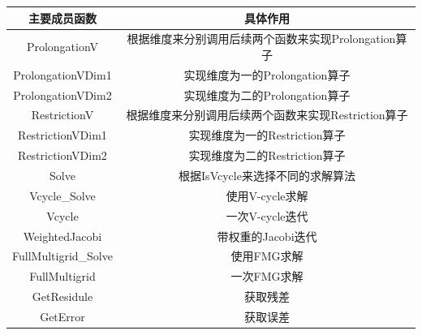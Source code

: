 \documentclass[twoside,a4paper]{article}
\begin{document}
\begin{center}
    \begin{tabular}{c|c}
        主要成员函数         & 具体作用                                             \\
        \hline
        ProlongationV        & 根据维度来分别调用后续两个函数来实现Prolongation算子 \\
        ProlongationVDim1    & 实现维度为一的Prolongation算子                       \\
        ProlongationVDim2    & 实现维度为二的Prolongation算子                       \\
        RestrictionV         & 根据维度来分别调用后续两个函数来实现Restriction算子  \\
        RestrictionVDim1     & 实现维度为一的Restriction算子                        \\
        RestrictionVDim2     & 实现维度为二的Restriction算子                        \\
        Solve                & 根据IsVcycle来选择不同的求解算法                     \\
        Vcycle\_Solve        & 使用V-cycle求解                                      \\
        Vcycle               & 一次V-cycle迭代                                      \\
        WeightedJacobi       & 带权重的Jacobi迭代                                   \\
        FullMultigrid\_Solve & 使用FMG求解                                          \\
        FullMultigrid        & 一次FMG求解                                          \\
        GetResidule          & 获取残差                                             \\
        GetError             & 获取误差                                             \\
    \end{tabular}
\end{center}
\end{document}
